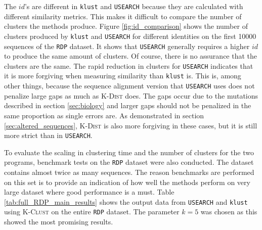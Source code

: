 The $id$'s are different in \texttt{klust} and \texttt{USEARCH} because they
are calculated with different similarity metrics. This makes it difficult to
compare the number of clusters the methods produce. Figure
\ref{fig:id_comparison} shows the number of clusters produced by \texttt{klust}
and \texttt{USEARCH} for different identities on the first \num{10000}
sequences of the \texttt{RDP} dataset. It shows that \texttt{USEARCH} generally
requires a higher $id$ to produce the same amount of clusters. Of course, there
is no assurance that the clusters are the same. The rapid reduction in clusters
for \texttt{USEARCH} indicates that it is more forgiving when measuring
similarity than \texttt{klust} is. This is, among other things, because the
sequence alignment version that \texttt{USEARCH} uses does not penalize large
gaps as much as \textsc{K-Dist} does. The gaps occur due to the mutations
described in section \ref{sec:biology} and larger gaps should not be penalized
in the same proportion as single errors are. As demonstrated in section
\ref{sec:altered_sequences}, \textsc{K-Dist} is also more forgiving in these
cases, but it is still more strict than in \texttt{USEARCH}.

To evaluate the scaling in clustering time and the number of clusters for the
two programs, benchmark tests on the \texttt{RDP} dataset were also conducted.
The dataset contains almost twice as many sequences. The reason benchmarks are
performed on this set is to provide an indication of how well the methods
perform on very large dataset where good performance is a must. Table
\ref{tab:full_RDP_main_results} shows the output data from \texttt{USEARCH} and
\texttt{klust} using \textsc{K-Clust} on the entire \texttt{RDP} dataset.  The
parameter $k=5$ was chosen as this showed the most promising results.

